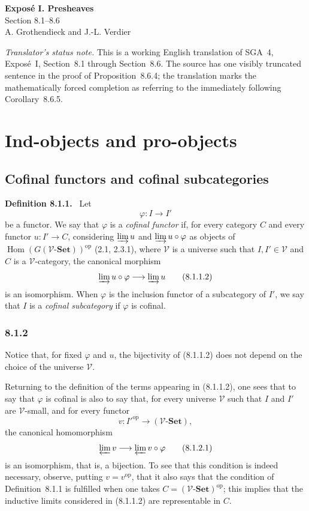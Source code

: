 \documentclass[11pt]{article}
\newcommand{\V}{\mathcal{V}}
\newcommand{\Set}{\mathbf{Set}}
\newcommand{\op}{\mathrm{op}}
\newcommand{\Hhom}{\operatorname{Hom}}
\newenvironment{statement}[1]{\par\medskip\noindent\textbf{#1.}\ }{\par\medskip}
\begin{document}
\begin{center}
{\Large \textbf{Expos\'e I. Presheaves}}\\[0.35em]
{\large Section 8.1--8.6}\\[0.35em]
A. Grothendieck and J.-L. Verdier
\end{center}

\bigskip

\noindent\emph{Translator's status note.} This is a working English translation of SGA~4, Expos\'e~I, Section~8.1 through Section~8.6. The source has one visibly truncated sentence in the proof of Proposition~8.6.4; the translation marks the mathematically forced completion as referring to the immediately following Corollary~8.6.5.

\setcounter{section}{7}
\section{Ind-objects and pro-objects}

\subsection{Cofinal functors and cofinal subcategories}

\begin{statement}{Definition 8.1.1}
Let
\[
\varphi:I\longrightarrow I'
\tag{8.1.1.1}
\]
be a functor. We say that $\varphi$ is a \emph{cofinal functor} if, for every category $C$ and every functor $u:I'\to C$, considering $\varinjlim u$ and $\varinjlim u\circ\varphi$ as objects of $\Hhom(G(\V\text{-}\Set))^{\op}$ (2.1, 2.3.1), where $\V$ is a universe such that $I,I'\in\V$ and $C$ is a $\V$-category, the canonical morphism
\[
\varinjlim u\circ\varphi\longrightarrow \varinjlim u
\tag{8.1.1.2}
\]
is an isomorphism. When $\varphi$ is the inclusion functor of a subcategory of $I'$, we say that $I$ is a \emph{cofinal subcategory} if $\varphi$ is cofinal.
\end{statement}

\subsubsection*{8.1.2}
Notice that, for fixed $\varphi$ and $u$, the bijectivity of (8.1.1.2) does not depend on the choice of the universe $\V$.

Returning to the definition of the terms appearing in (8.1.1.2), one sees that to say that $\varphi$ is cofinal is also to say that, for every universe $\V$ such that $I$ and $I'$ are $\V$-small, and for every functor
\[
v:{I'}^{\op}\longrightarrow (\V\text{-}\Set),
\]
the canonical homomorphism
\[
\varprojlim v\longrightarrow \varprojlim v\circ\varphi
\tag{8.1.2.1}
\]
is an isomorphism, that is, a bijection. To see that this condition is indeed necessary, observe, putting $v=v^{\op}$, that it also says that the condition of Definition~8.1.1 is fulfilled when one takes $C=(\V\text{-}\Set)^{\op}$; this implies that the inductive limits considered in (8.1.1.2) are representable in $C$.
\end{document}
